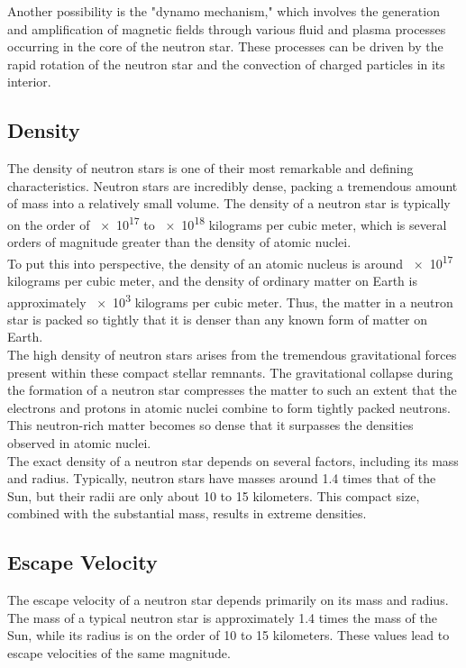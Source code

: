 Another possibility is the "dynamo mechanism," which involves the generation and amplification of magnetic fields through various fluid and plasma processes occurring in the core of the neutron star. These processes can be driven by the rapid rotation of the neutron star and the convection of charged particles in its interior.

\subsection{Density}
The density of neutron stars is one of their most remarkable and defining characteristics. Neutron stars are incredibly dense, packing a tremendous amount of mass into a relatively small volume. The density of a neutron star is typically on the order of \num{e17} to \num{e18} kilograms per cubic meter, which is several orders of magnitude greater than the density of atomic nuclei.\\

To put this into perspective, the density of an atomic nucleus is around \num{e17} kilograms per cubic meter, and the density of ordinary matter on Earth is approximately \num{e3} kilograms per cubic meter. Thus, the matter in a neutron star is packed so tightly that it is denser than any known form of matter on Earth.\\

The high density of neutron stars arises from the tremendous gravitational forces present within these compact stellar remnants. The gravitational collapse during the formation of a neutron star compresses the matter to such an extent that the electrons and protons in atomic nuclei combine to form tightly packed neutrons. This neutron-rich matter becomes so dense that it surpasses the densities observed in atomic nuclei.\\

The exact density of a neutron star depends on several factors, including its mass and radius. Typically, neutron stars have masses around 1.4 times that of the Sun, but their radii are only about 10 to 15 kilometers. This compact size, combined with the substantial mass, results in extreme densities.

\subsection{Escape Velocity}
The escape velocity of a neutron star depends primarily on its mass and radius. The mass of a typical neutron star is approximately 1.4 times the mass of the Sun, while its radius is on the order of 10 to 15 kilometers. These values lead to escape velocities of the same magnitude.\\

